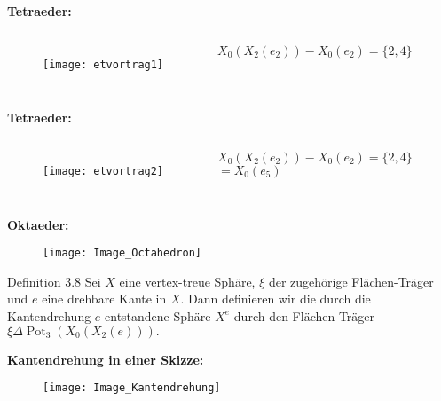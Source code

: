 \documentclass{beamer}
\DeclareMathOperator{\Pot}{Pot}
\begin{document}
\begin{frame}
\textbf{Tetraeder:}
\begin{columns}

\begin{figure}[H]
\begin{center}
\texttt{[image: etvortrag1]}
\end{center}
\end{figure}

  \pause  $X_0(X_2(e_2))-X_0(e_2)=\{2,4\}$\\%
    
\end{columns}
\end{frame}
\begin{frame}
\textbf{Tetraeder:}
\begin{columns}

\begin{figure}[H]
\begin{center}
\texttt{[image: etvortrag2]}
\end{center}
\end{figure}

    $X_0(X_2(e_2))-X_0(e_2)=\{2,4\}$\\%
     $=X_0(e_5)$
\end{columns}
\end{frame}
\begin{frame}
\textbf{Oktaeder:}
\begin{figure}[H]
\begin{center}
\texttt{[image: Image\_Octahedron]}
\end{center}
\end{figure}
\end{frame}
\begin{frame}
\begin{block}{Definition 3.8}
Sei $X$ eine vertex-treue Sphäre, $\xi$ der zugehörige Flächen-Träger und $e$ eine drehbare Kante in $X$. Dann definieren wir die durch die Kantendrehung $e$ entstandene Sphäre $X^e$ durch den Flächen-Träger $\xi \Delta \Pot_3(X_0(X_2(e))).$
\end{block}
\end{frame}
\begin{frame}
\textbf{Kantendrehung in einer Skizze:}
\begin{figure}[H]
\begin{center}
\texttt{[image: Image\_Kantendrehung]}
\end{center}
\end{figure}
\end{frame}
\end{document}
